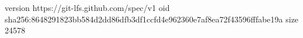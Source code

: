 version https://git-lfs.github.com/spec/v1
oid sha256:8648291823bb584d2dd86dfb3df1ccfd4e962360e7af8ea72f43596fffabe19a
size 24578
